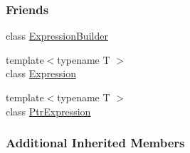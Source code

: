 \subsubsection*{Friends}
\begin{DoxyCompactItemize}
\item 
class \hyperlink{classCatch_1_1ResultInfoBuilder_a1912ceb0cba0cbbf0291b374a84f0608}{Expression\-Builder}
\item 
{\footnotesize template$<$typename T $>$ }\\class \hyperlink{classCatch_1_1ResultInfoBuilder_afda064da5c8339135d205a860b149338}{Expression}
\item 
{\footnotesize template$<$typename T $>$ }\\class \hyperlink{classCatch_1_1ResultInfoBuilder_a26079e28b8ef20b8a53337a19d519904}{Ptr\-Expression}
\end{DoxyCompactItemize}
\subsubsection*{Additional Inherited Members}


